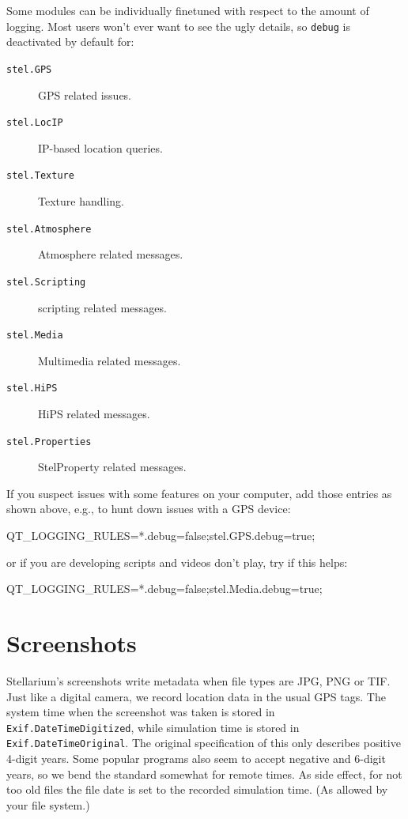 Some modules can be individually finetuned with respect to the amount of logging.  
Most users won't ever want to see the ugly details, so \texttt{debug} is deactivated by default for: 
\begin{description}
\item[\texttt{stel.GPS}] GPS related issues.
\item[\texttt{stel.LocIP}] IP-based location queries.
\item[\texttt{stel.Texture}] Texture handling.
\item[\texttt{stel.Atmosphere}] Atmosphere related messages.
\item[\texttt{stel.Scripting}] scripting related messages.
\item[\texttt{stel.Media}] Multimedia related messages.
\item[\texttt{stel.HiPS}] HiPS related messages.
\item[\texttt{stel.Properties}] StelProperty related messages.
\end{description}

If you suspect issues with some features on your computer, add those entries as shown above, e.g., to hunt down issues with a GPS device:
\begin{configfile}
QT_LOGGING_RULES=*.debug=false;stel.GPS.debug=true;
\end{configfile}
or if you are developing scripts and videos don't play, try if this helps:
\begin{configfile}
QT_LOGGING_RULES=*.debug=false;stel.Media.debug=true;
\end{configfile}

\section{Screenshots}
\label{sec:Screenshots}

Stellarium's screenshots write metadata when file types are JPG, PNG or TIF. 
Just like a digital camera, we record location data in the usual GPS tags. 
The system time when the screenshot was taken is stored in \texttt{Exif.DateTimeDigitized}, 
while simulation time is stored in \texttt{Exif.DateTimeOriginal}. The original specification of this only describes positive 4-digit years. 
Some popular programs also seem to accept negative and 6-digit years, so we bend the standard somewhat for remote times. 
As side effect, for not too old files the file date is set to the recorded simulation time. (As allowed by your file system.) 

